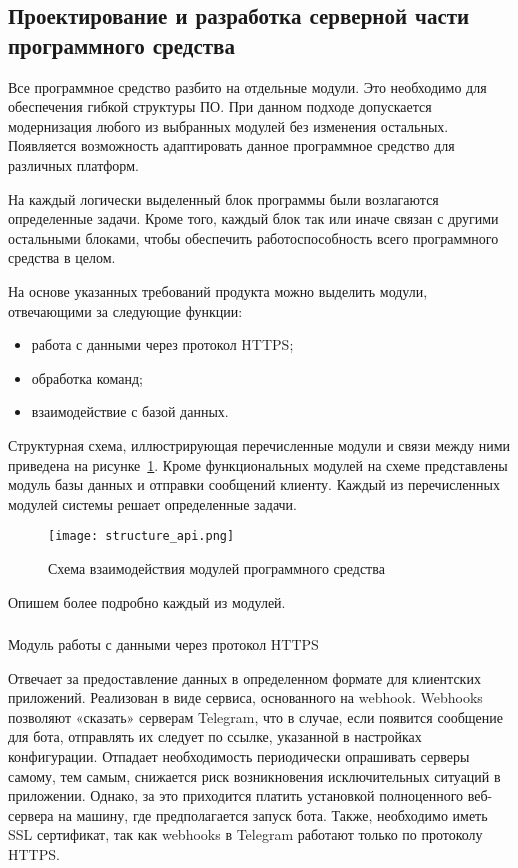 \subsection{Проектирование и разработка серверной части программного средства}
\label{sec:design:server}

Все программное средство разбито на отдельные модули. Это
необходимо для обеспечения гибкой структуры ПО. При данном подходе
допускается модернизация любого из выбранных модулей без изменения
остальных. Появляется возможность адаптировать данное программное
средство для различных платформ.

На каждый логически выделенный блок программы были возлагаются
определенные задачи. Кроме того, каждый блок так или иначе связан с
другими остальными блоками, чтобы обеспечить работоспособность всего
программного средства в целом.

На основе указанных требований продукта можно выделить модули, отвечающими за следующие функции:

\begin{itemize}
	\item работа с данными через протокол HTTPS;
	\item обработка команд;
	\item взаимодействие с базой данных.
\end{itemize}

Структурная схема, иллюстрирующая перечисленные модули и связи
между ними приведена на рисунке~\ref{fig:design:architecture:structure_api}. Кроме функциональных модулей на
схеме представлены модуль базы данных и отправки сообщений клиенту.
Каждый из перечисленных модулей системы решает определенные задачи.

\begin{figure}[!h]
\centering
	\texttt{[image: structure\_api.png]}
	\caption{Схема взаимодействия модулей программного средства}
	\label{fig:design:architecture:structure_api}
\end{figure}

Опишем более подробно каждый из модулей.

\subsubsection{} Модуль работы с данными через протокол HTTPS
\label{sec:design:server:api}

Отвечает за предоставление данных в определенном формате для клиентских приложений. Реализован в виде сервиса, основанного на webhook. Webhooks позволяют «сказать» серверам Telegram, что в случае, если появится сообщение для бота, отправлять их следует по ссылке, указанной в настройках конфигурации. Отпадает необходимость периодически опрашивать серверы самому, тем самым, снижается риск возникновения исключительных ситуаций в приложении. Однако, за это приходится платить установкой полноценного веб-сервера на машину, где предполагается запуск бота. Также, необходимо иметь SSL сертификат, так как webhooks в Telegram работают только по протоколу HTTPS.

